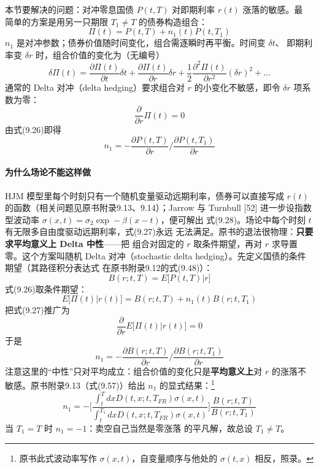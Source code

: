 本节要解决的问题：对冲零息国债 $P(t,T)$ 对即期利率 $r(t)$ 涨落的敏感。最
简单的方案是用另一只期限 $T_1\neq T$ 的债券构造组合：
\begin{equation*}
\Pi(t)=P(t,T)+n_1(t)P(t,T_1)\tag{9.26}
\end{equation*}
$n_1$ 是对冲参数；债券价值随时间变化，组合需逐瞬时再平衡。时间变 $\delta t$、
即期利率变 $\delta r$ 时，组合价值的变化为（无编号）
\begin{equation*}
\delta\Pi(t)=\frac{\partial\Pi(t)}{\partial t}\delta t
+\frac{\partial\Pi(t)}{\partial r}\delta r
+\frac{1}{2}\frac{\partial^{2}\Pi(t)}{\partial r^{2}}(\delta r)^{2}
+\dots
\end{equation*}
通常的 Delta 对冲（delta hedging）要求组合对 $r$ 的小变化不敏感，即令
$\delta r$ 项系数为零：
\begin{equation*}
\frac{\partial}{\partial r}\Pi(t)=0\tag{9.27}
\end{equation*}
由式(9.26)即得
\begin{equation*}
n_1=-\frac{\partial P(t,T)}{\partial r}\bigg/\frac{\partial P(t,T_1)}
{\partial r}\tag{9.28}
\end{equation*}

\paragraph{为什么场论不能这样做}
HJM 模型里每个时刻只有一个随机变量驱动远期利率，债券可以直接写成
$r(t)$ 的函数（相关问题见原书附录9.13、9.14）；Jarrow 与 Turnbull [52]
进一步设指数型波动率 $\sigma(x,t)=\sigma_2\exp-\beta(x-t)$，便可解出
式(9.28)。场论中每个时刻 $t$ 有无限多自由度驱动远期利率，式(9.27)永远
无法满足。原书的退法很物理：\textbf{只要求平均意义上 Delta 中性}——把
组合对固定的 $r$ 取条件期望，再对 $r$ 求导置零。这个方案叫随机 Delta
对冲（stochastic delta hedging）。先定义国债的条件期望（其路径积分表达式
在原书附录9.12的式(9.48)）：
\begin{equation*}
B(r;t,T)=E\bigl[P(t,T)\bigl|r\bigr]\tag{9.29}
\end{equation*}
式(9.26)取条件期望：
\begin{equation*}
E\bigl[\Pi(t)|r(t)\bigr]=B(r;t,T)+n_1(t)B(r;t,T_1)\tag{9.30}
\end{equation*}
把式(9.27)推广为
\begin{equation*}
\frac{\partial}{\partial r}E\bigl[\Pi(t)|r(t)\bigr]=0\tag{9.31}
\end{equation*}
于是
\begin{equation*}
n_1=-\frac{\partial B(r;t,T)}{\partial r}\bigg/
\frac{\partial B(r;t,T_1)}{\partial r}\tag{9.32}
\end{equation*}
注意这里的“中性”只对平均成立：组合价值的变化只是\textbf{平均意义上}对
$r$ 的涨落不敏感。原书附录9.13（式(9.57)）给出 $n_1$ 的显式结果：\footnote{原书此式波动率写作 $\sigma(x,t)$，自变量顺序与他处的
$\sigma(t,x)$ 相反，照录。}
\begin{equation*}
n_1=-\biggl[\frac{\int_{t}^{T}dxD(t,x;t,T_{FR})\sigma(x,t)}
{\int_{t}^{T_1}dxD(t,x;t,T_{FR})\sigma(x,t)}\biggr]
\frac{B(r;t,T)}{B(r;t,T_1)}\tag{9.33}
\end{equation*}当 $T_1=T$ 时 $n_1=-1$：卖空自己当然是零涨落
的平凡解，故总设 $T_1\neq T$。

